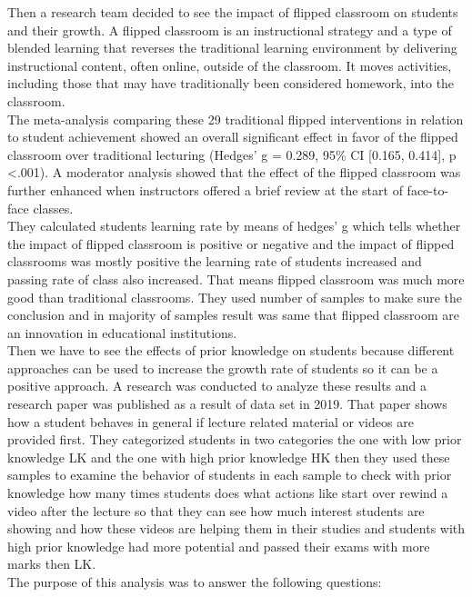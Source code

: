 Then a research team decided to see the impact of flipped classroom on students and their growth. A flipped classroom is an instructional strategy and a type of blended learning that reverses the traditional learning environment by delivering instructional content, often online, outside of the classroom. It moves activities, including those that may have traditionally been considered homework, into the classroom.\\
The meta-analysis comparing these 29 traditional flipped interventions in relation to student achievement showed an overall significant effect in favor of the flipped classroom over traditional lecturing (Hedges' g = 0.289, 95\% CI [0.165, 0.414], p \textless .001). A moderator analysis showed that the effect of the flipped classroom was further enhanced when instructors offered a brief review at the start of face-to-face classes.\\
They calculated students learning rate by means of hedges' g which tells whether the impact of flipped classroom is positive or negative and the impact of flipped classrooms was mostly positive the learning rate of students increased and passing rate of class also increased. That means flipped classroom was much more good than traditional classrooms. They used number of samples to make sure the conclusion and in majority of samples result was same that flipped classroom are an innovation in educational institutions.\cite{Lo2019}\\
Then we have to see the effects of prior knowledge on students because different approaches can be used to increase the growth rate of students so it can be a positive approach. A research was conducted to analyze these results and a research paper was published as a result of data set in 2019. That paper shows how a student behaves in general if lecture related material or videos are provided first. They categorized students in two categories the one with low prior knowledge LK and the one with high prior knowledge HK then they used these samples to examine the behavior of students in each sample to check with prior knowledge how many times students does what actions like start over rewind a video after the lecture so that they can see how much interest students are showing and how these videos are helping them in their studies and students with high prior knowledge had more potential and passed their exams with more marks then LK.\\
The purpose of this analysis was to answer the following questions:\\
